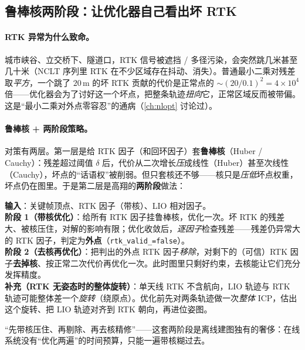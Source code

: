 \subsection{鲁棒核两阶段：让优化器自己看出坏 RTK}
\label{sec:lidar-map-robust}

\paragraph{RTK 异常为什么致命。}
城市峡谷、立交桥下、隧道口，RTK 信号被遮挡 / 多径污染，会突然跳几米甚至几十米（NCLT 序列里 RTK 在不少区域存在抖动、消失）。普通最小二乘对残差取\emph{平方}，一个跳了 $20$\,m 的坏 RTK 贡献的代价是正常点的 $\sim\!(20/0.1)^2=4\times10^4$ 倍——优化器会为了讨好这一个坏点，把整条轨迹\emph{扭向}它，正常区域反而被带偏。这是“最小二乘对外点零容忍”的通病（\cref{ch:nlopt} 讨论过）。

\paragraph{鲁棒核 + 两阶段策略。}
对策有两层。第一层是给 RTK 因子（和回环因子）套\textbf{鲁棒核}（Huber / Cauchy）：残差超过阈值 $\delta$ 后，代价从二次增长\emph{压}成线性（Huber）甚至次线性（Cauchy），坏点的“话语权”被削弱。但只套核还不够——核只是\emph{压低}坏点权重，坏点仍在图里。于是第二层是高翔的\textbf{两阶段}做法\cite{gao2023slamad}：

\begin{algo}
\textbf{输入}：关键帧顶点、RTK 因子（带核）、LIO 相对因子。\\[2pt]
\textbf{阶段 1（带核优化）}：给所有 RTK 因子挂鲁棒核，优化一次。坏 RTK 的残差大、被核压住，对解的影响有限；优化收敛后，\emph{逐因子}检查残差——残差仍异常大的 RTK 因子，判定为\textbf{外点}（\texttt{rtk\_valid\_=false}）。\\[2pt]
\textbf{阶段 2（去核再优化）}：把判出的外点 RTK 因子\emph{移除}，对剩下的（可信）RTK 因子\textbf{去掉核}、按正常二次代价再优化一次。此时图里只剩好约束，去核能让它们充分发挥精度。\\[2pt]
\textbf{补充（RTK 无姿态时的整体旋转）}：单天线 RTK 不含航向，LIO 轨迹与 RTK 轨迹可能整体差一个\emph{旋转}（绕原点）。优化前先对两条轨迹做一次\emph{整体} ICP，估出这个旋转、把 LIO 轨迹对齐到 RTK 朝向，再进位姿图。
\end{algo}

\noindent“先带核压住、再剔除、再去核精修”——这套两阶段是离线建图独有的奢侈：在线系统没有“优化两遍”的时间预算，只能一遍带核糊过去。

